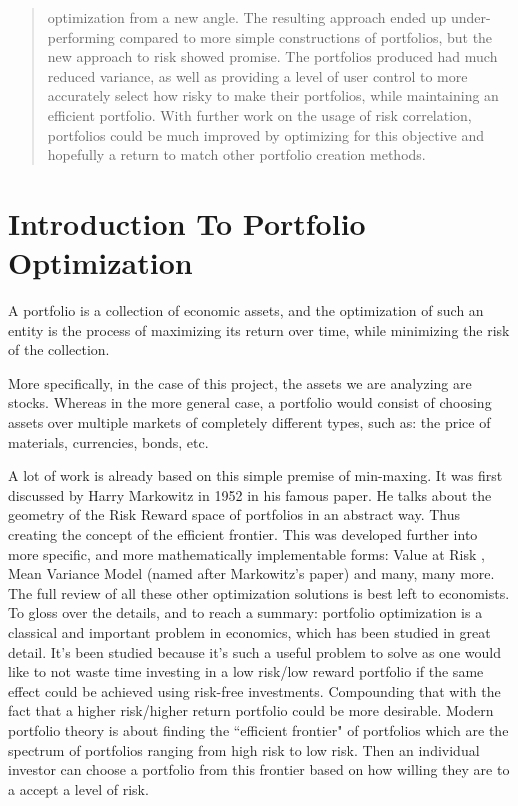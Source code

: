 \documentclass[11pt]{article}
\begin{document}
\begin{titlingpage}
\begin{abstract}
        optimization from a new angle. The resulting approach ended up
        under-performing compared to more simple constructions of portfolios, but the new
        approach to risk showed promise. The portfolios produced had much reduced
        variance, as well as providing a level of user control to more accurately
        select how risky to make their portfolios, while maintaining an efficient
        portfolio. With further work on the usage of risk correlation, portfolios
        could be much improved by optimizing for this objective and hopefully
        a return to match other portfolio creation methods.
    \end{abstract}
\end{titlingpage}

\tableofcontents
\pagebreak

\section{Introduction To Portfolio Optimization}

    A portfolio is a collection of economic assets, and the optimization of such an
    entity is the process of maximizing its return over time, while minimizing the
    risk of the collection.

    More specifically, in the case of this project, the assets we are analyzing are
    stocks. Whereas in the more general case, a portfolio would consist of choosing
    assets over multiple markets of completely different types, such as: the price of 
    materials, currencies, bonds, etc.

    A lot of work is already based on this simple premise of min-maxing. It was first
    discussed by Harry Markowitz in 1952 \cite{Markowitz}
    in his famous paper. He talks about the geometry of the Risk Reward space
    of portfolios in an abstract way. Thus creating the concept of the efficient frontier.
    This was developed further into more specific, and more mathematically implementable
    forms: Value at Risk \cite{ValueAtRisk, Ghaoui}, Mean Variance Model (named
    after Markowitz's paper) \cite{Robert, SidWard} and many, many more.
    The full review of all these other optimization solutions is best left
    to economists. To gloss over the details, and to reach a summary: portfolio
    optimization is a classical and important problem in economics, which has
    been studied in great detail. It's been studied because it's such a useful
    problem to solve as one would like to
    not waste time investing in a low risk/low reward portfolio if the same
    effect could be achieved using risk-free investments. Compounding
    that with the fact that a higher risk/higher return portfolio could
    be more desirable. Modern portfolio theory is about finding the ``efficient
    frontier" of portfolios which are the spectrum of portfolios ranging from
    high risk to low risk. Then an individual investor can choose a portfolio
    from this frontier based on how willing they are to a accept a level of
    risk.
\end{document}

